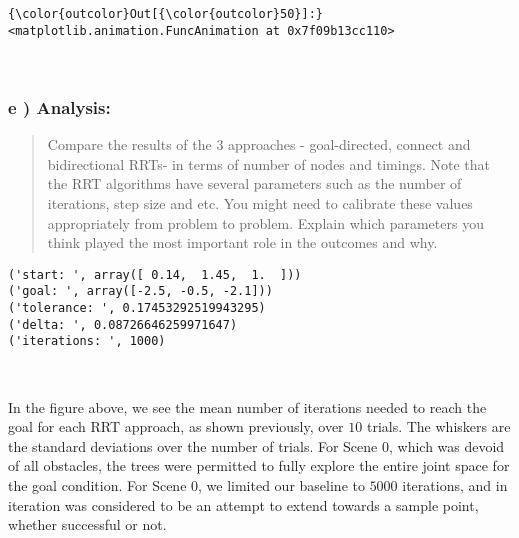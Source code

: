 \documentclass{article}
\begin{document}
            \begin{Verbatim}[commandchars=\\\{\}]
{\color{outcolor}Out[{\color{outcolor}50}]:} <matplotlib.animation.FuncAnimation at 0x7f09b13cc110>
\end{Verbatim}
        
    \begin{center}
    \end{center}
    { \hspace*{\fill} \\}
    

    \subsubsection{e ) Analysis:}


    \begin{quote}
Compare the results of the 3 approaches - goal-directed, connect and
bidirectional RRTs- in terms of number of nodes and timings. Note that
the RRT algorithms have several parameters such as the number of
iterations, step size and etc. You might need to calibrate these values
appropriately from problem to problem. Explain which parameters you
think played the most important role in the outcomes and why.
\end{quote}


    \begin{Verbatim}[commandchars=\\\{\}]
('start: ', array([ 0.14,  1.45,  1.  ]))
('goal: ', array([-2.5, -0.5, -2.1]))
('tolerance: ', 0.17453292519943295)
('delta: ', 0.08726646259971647)
('iterations: ', 1000)
    \end{Verbatim}



    \begin{center}
    \end{center}
    { \hspace*{\fill} \\}
    
    In the figure above, we see the mean number of iterations needed to
reach the goal for each RRT approach, as shown previously, over $10$
trials. The whiskers are the standard deviations over the number of
trials. For Scene 0, which was devoid of all obstacles, the trees were
permitted to fully explore the entire joint space for the goal
condition. For Scene 0, we limited our baseline to $5000$ iterations,
and in iteration was considered to be an attempt to extend towards a
sample point, whether successful or not.
\end{document}
